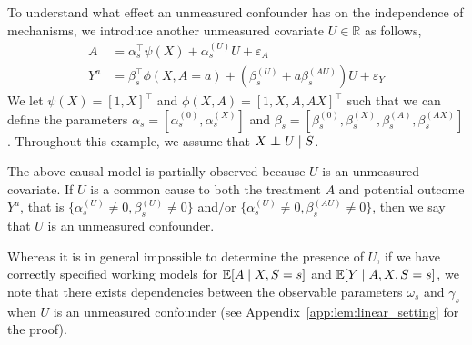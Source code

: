 \documentclass{article}
\begin{document}
To understand what effect an unmeasured confounder has on the independence of mechanisms, we introduce another unmeasured covariate $U\in\mathbb{R}$ as follows,
\begin{equation} \label{eq:linear_example}
    \begin{aligned}
        A &= \alpha_s^\top \psi(X) + \alpha_{s}^{(U)} U + \varepsilon_A \\
        Y^a &= \beta_s^\top \phi(X,A=a) + \left(\beta_s^{(U)} + a\beta_s^{(AU)}\right) U + \varepsilon_Y
    \end{aligned}
\end{equation}
We let $\psi(X)=[1,X]^\top$ and $\phi(X,A) = [1,X,A,AX]^\top$ such that we can define the parameters $\alpha_s=[\alpha_s^{(0)},\alpha_s^{(X)}]$ and $\beta_s=[\beta_s^{(0)},\beta_s^{(X)}, \beta_s^{(A)}, \beta_s^{(AX)}]$. Throughout this example, we assume that $X\indep U \mid S$.

The above causal model is partially observed because $U$ is an unmeasured covariate. If $U$ is a common cause to both the treatment $A$ and potential outcome $Y^a$, that is $\{\alpha_{s}^{(U)}\neq 0, \beta_{s}^{(U)}\neq 0\}$ and/or $\{\alpha_{s} ^{(U)}\neq 0, \beta_{s}^{(AU)}\neq 0\}$, then we say that $U$ is an unmeasured confounder.

Whereas it is in general impossible to determine the presence of $U$, if we have correctly specified working models for $\mathbb{E}[A\mid X, S=s]$ and $\mathbb{E}[Y\mid A, X, S=s]$, we note that there exists dependencies between the observable parameters $\omega_s$ and $\gamma_s$ when $U$ is an unmeasured confounder (see Appendix~\ref{app:lem:linear_setting} for the proof).
\end{document}
